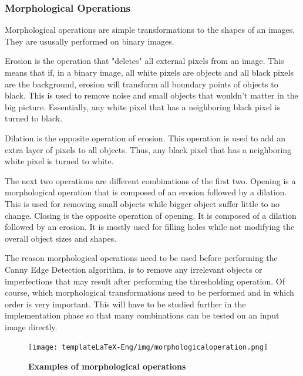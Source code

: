 \documentclass[12pt,a4paper,twoside]{report}
\begin{document}
\subsubsection{Morphological Operations}
Morphological operations are simple transformations to the shapes of an images. They are ususally performed on binary images. 

Erosion is the operation that "deletes" all external pixels from an image. This means that if, in a binary image, all white pixels are objects and all black pixels are the background, erosion will transform all boundary points of objects to black. This is used to remove noise and small objects that wouldn't matter in the big picture. Essentially, any white pixel that has a neighboring black pixel is turned to black.

Dilation is the opposite operation of erosion. This operation is used to add an extra layer of pixels to all objects. Thus, any black pixel that has a neighboring white pixel is turned to white.

The next two operations are different combinations of the first two. Opening is a morphological operation that is composed of an erosion followed by a dilation. This is used for removing small objects while bigger object suffer little to no change. Closing is the opposite operation of opening. It is composed of a dilation followed by an erosion. It is mostly used for filling holes while not modifying the overall object sizes and shapes.

The reason morphological operations need to be used before performing the Canny Edge Detection algorithm, is to remove any irrelevant objects or imperfections that may result after performing the thresholding operation. Of course, which morphological transformations need to be performed and in which order is very important. This will have to be studied further in the implementation phase so that many combinations can be tested on an input image directly.

\begin{figure}[H]
    \begin{center}
        \texttt{[image: templateLaTeX-Eng/img/morphologicaloperation.png]}
        \caption{\bf Examples of morphological operations\footnotemark}
    \end{center}
\end{figure}
\end{document}
